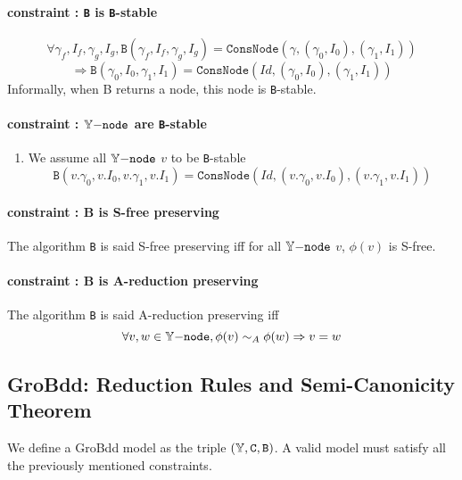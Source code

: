 \documentclass[a4paper,10pt]{article}
\begin{document}
\paragraph{constraint : \texttt{B} is \texttt{B}-stable\\}
\[\forall \gamma_f, I_f, \gamma_g, I_g, \mathtt{B}(\gamma_f, I_f, \gamma_g, I_g) = \mathtt{ConsNode}(\gamma, (\gamma_0, I_0), (\gamma_1, I_1))\]
\[\Rightarrow \mathtt{B}(\gamma_0, I_0, \gamma_1, I_1) = \mathtt{ConsNode}(Id, (\gamma_0, I_0), (\gamma_1, I_1))\]
Informally, when B returns a node, this node is \texttt{B}-stable.

\paragraph{constraint : $\mathbb{Y}\mathtt{-node}$ are \texttt{B}-stable}
\begin{enumerate}
\item We assume all $\mathbb{Y}\mathtt{-node}$ $v$ to be \texttt{B}-stable
\[\mathtt{B}(v.\gamma_0, v.I_0, v.\gamma_1, v.I_1) = \mathtt{ConsNode}(Id, (v.\gamma_0, v.I_0), (v.\gamma_1, v.I_1))\]
\end{enumerate}

\paragraph{constraint : B is S-free preserving\\}
The algorithm \texttt{B} is said S-free preserving iff for all $\mathbb{Y}\mathtt{-node}$ $v$, $\phi(v)$ is S-free.

\paragraph{constraint : B is A-reduction preserving\\}
The algorithm \texttt{B} is said A-reduction preserving iff
\[\forall v, w \in\mathbb{Y}\mathtt{-node}, \phi(v) \sim_A \phi(w) \Rightarrow v = w\]

\subsection{GroBdd: Reduction Rules and Semi-Canonicity Theorem\label{grobdd-reduction}}
We define a GroBdd model as the triple $(\mathbb{Y}, \mathtt{C}, \mathtt{B})$.
A valid model must satisfy all the previously mentioned constraints.
\end{document}
